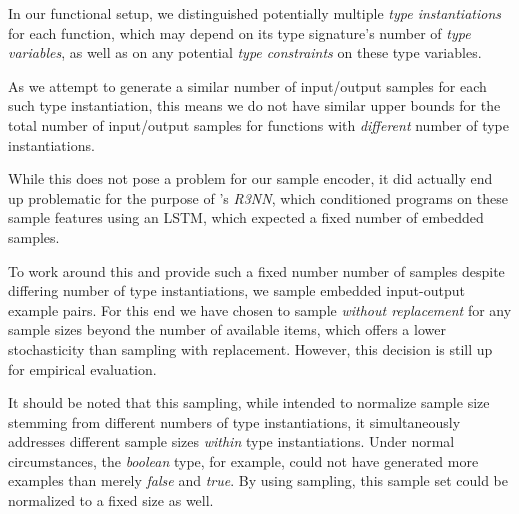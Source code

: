 \documentclass{article}
\begin{document}
    In our functional setup,
    we distinguished potentially multiple \emph{type instantiations} for each function,
    which may depend on its type signature's number of \emph{type variables},
    as well as on any potential \emph{type constraints} on these type variables.

    As we attempt to generate a similar number of input/output samples for each such type instantiation,
    this means we do not have similar upper bounds for the total number of input/output samples for functions with \emph{different} number of type instantiations.

    While this does not pose a problem for our sample encoder,
    it did actually end up problematic for the purpose of \citet{nsps}'s \emph{R3NN},
    which conditioned programs on these sample features using an LSTM,
    which expected a fixed number of embedded samples.

    To work around this and provide such a fixed number number of samples despite differing number of type instantiations,
    we sample embedded input-output example pairs.
    For this end we have chosen to sample \emph{without replacement} for any sample sizes beyond the number of available items,
    which offers a lower stochasticity than sampling with replacement.
    However, this decision is still up for empirical evaluation.

    It should be noted that this sampling,
    while intended to normalize sample size stemming from different numbers of type instantiations,
    it simultaneously addresses different sample sizes \emph{within} type instantiations.
    Under normal circumstances, the \emph{boolean} type, for example,
    could not have generated more examples than merely \emph{false} and \emph{true}.
    By using sampling, this sample set could be normalized to a fixed size as well.
\end{document}
